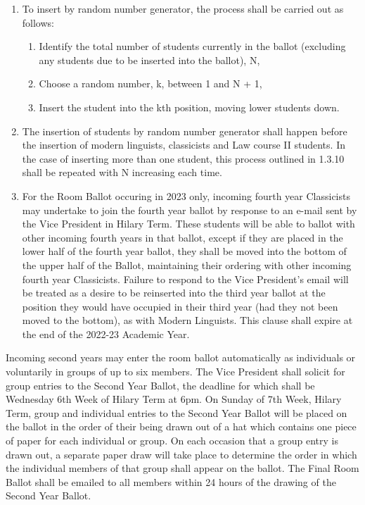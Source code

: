 \begin{enumerate}
\item To insert by random number generator, the process shall be carried out as follows:
\begin{enumerate}
\item Identify the total number of students currently in the ballot (excluding any students due to be inserted into the ballot), N,
\item Choose a random number, k, between 1 and N + 1,
\item Insert the student into the kth position, moving lower students down.
\end{enumerate}
\item The insertion of students by random number generator shall happen before the insertion of modern linguists, classicists and Law course II students. In the case of inserting more than one student, this process outlined in 1.3.10 shall be repeated with N increasing each time.
\item For the Room Ballot occuring in 2023 only, incoming fourth year Classicists may undertake to join the fourth year ballot by response to an e-mail sent by the Vice President in Hilary Term. These students will be able to ballot with other incoming fourth years in that ballot, except if they are placed in the lower half of the fourth year ballot, they shall be moved into the bottom of the upper half of the Ballot, maintaining their ordering with other incoming fourth year Classicists. Failure to respond
to the Vice President’s email will be treated as a desire to be reinserted  into the third year ballot at the position they would have occupied in their third year (had they not been moved to the bottom), as with Modern Linguists. This clause shall expire at the end of the 2022-23 Academic Year.
\end{enumerate}

\appnpara Incoming second years may enter the room ballot automatically as individuals or voluntarily in groups of up to six members.
\appnpara The Vice President shall solicit for group entries to the Second Year Ballot, the deadline for which shall be Wednesday 6th Week of Hilary Term at 6pm.
\appnpara On Sunday of 7th Week, Hilary Term, group and individual entries to the Second Year Ballot will be placed on the ballot in the order of their being drawn out of a hat which contains one piece of paper for each individual or group. On each occasion that a group entry is drawn out, a separate paper draw will take place to determine the order in which the individual members of that group shall appear on the ballot.
\appnpara The Final Room Ballot shall be emailed to all members within 24 hours of the drawing of the Second Year Ballot.

